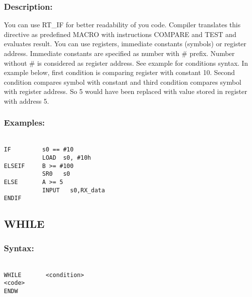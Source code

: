         \subsubsection{Description:}
        You can use RT\_IF for better readability of you code. Compiler translates this directive as predefined MACRO with instructions COMPARE and TEST and
        evaluates result. You can use registers, immediate constants (symbols) or register address. Immediate constants are specified as number with \# prefix.
        Number without \# is considered as register address. See example for conditions syntax. In example below, first condition is comparing register with constant 10. Second condition compares symbol with constant and third condition compares
        symbol with register address. So 5 would have been replaced with value stored in register with address 5.

        \subsubsection{Examples:}
        {
            ~\\
            \usecodefont
            \verb'IF         s0 == #10'\\
            \verb'           LOAD  s0, #10h'\\
            \verb'ELSEIF     B >= #100'\\
            \verb'           SR0   s0'\\
            \verb'ELSE       A >= 5'\\
            \verb'           INPUT   s0,RX_data'\\
            \verb'ENDIF'
        }

    \subsection{WHILE}
        \subsubsection{Syntax:}
        {
            ~\\
            \usecodefont
            \verb'WHILE       <condition>'\\
            \verb'<code>'\\
            \verb'ENDW'
        }\\

